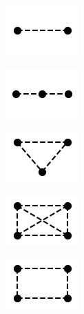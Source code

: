 \begin{figure}
    \begin{center}
        \begin{subfigure}{2.25cm}
            \includegraphics{theoretical_study/lattices/_2_site_chain.png}        
            \caption{}
        \end{subfigure}
        \qquad
        \begin{subfigure}{2.25cm} 
            \includegraphics{theoretical_study/lattices/_3_site_chain.png}
            \caption{}
        \end{subfigure}
        \qquad
        \begin{subfigure}{2.25cm} 
            \includegraphics{theoretical_study/lattices/_3_site_lattice_fully_connected.png}        
            \caption{}
        \end{subfigure}
        \qquad
        \begin{subfigure}{2.25cm} 
            \includegraphics{theoretical_study/lattices/_4_site_lattice_fully_connected.png}        
            \caption{}
        \end{subfigure}
        \qquad
        \begin{subfigure}{2.25cm} 
            \includegraphics{theoretical_study/lattices/_4_site_square.png}        
            \caption{}
        \end{subfigure}

\end{center}
\end{figure}

